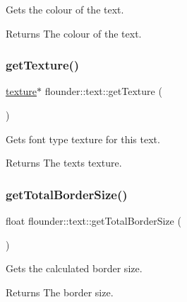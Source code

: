 Gets the colour of the text. 

\begin{DoxyReturn}{Returns}
The colour of the text. 
\end{DoxyReturn}
\mbox{\label{classflounder_1_1text_a9bb772e20f65be7cab18a52ba995af76}} 
\subsubsection{\texorpdfstring{get\+Texture()}{getTexture()}}
{\footnotesize\ttfamily \hyperlink{classflounder_1_1texture}{texture}$\ast$ flounder\+::text\+::get\+Texture (\begin{DoxyParamCaption}{ }\end{DoxyParamCaption})\hspace{0.3cm}{\ttfamily [inline]}}



Gets font type texture for this text. 

\begin{DoxyReturn}{Returns}
The texts texture. 
\end{DoxyReturn}
\mbox{\label{classflounder_1_1text_a374447968e82dd7e58e1cfb84c4adfb6}} 
\subsubsection{\texorpdfstring{get\+Total\+Border\+Size()}{getTotalBorderSize()}}
{\footnotesize\ttfamily float flounder\+::text\+::get\+Total\+Border\+Size (\begin{DoxyParamCaption}{ }\end{DoxyParamCaption})}



Gets the calculated border size. 

\begin{DoxyReturn}{Returns}
The border size. 
\end{DoxyReturn}
\mbox{\label{classflounder_1_1text_adb04bc6937cf7d117c489947bbff7635}} 
